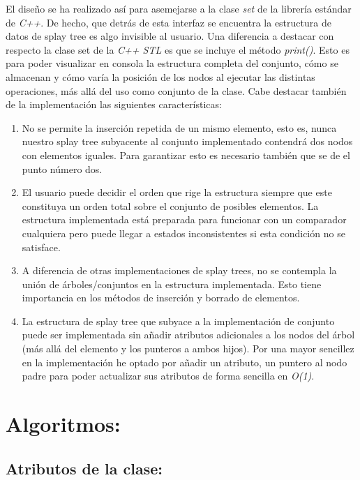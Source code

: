 \documentclass[letterpaper,12pt]{article}
\begin{document}
El diseño se ha realizado así para asemejarse a la clase \textit{set} de la 
librería estándar de \textit{C++}. De hecho, que detrás de esta interfaz se 
encuentra la estructura de datos de splay tree es algo invisible al usuario. 
Una diferencia a destacar con respecto la clase set de la \textit{C++ STL} es 
que se incluye el método \textit{print()}. Esto es para poder visualizar en 
consola la estructura completa del conjunto, cómo se almacenan y cómo varía la
posición de los nodos al ejecutar las distintas operaciones, más allá del uso 
como conjunto de la clase. Cabe destacar también de la implementación las 
siguientes características:

\begin{enumerate}
\setlength{\parskip}{0mm}         %

\item No se permite la inserción repetida de un mismo elemento, esto es, 
      nunca nuestro splay tree subyacente al conjunto implementado contendrá
      dos nodos con elementos iguales. Para garantizar esto es necesario 
      también que se de el punto número dos.
\item El usuario puede decidir el orden que rige la estructura siempre que 
      este constituya un orden total sobre el conjunto de posibles 
      elementos. La estructura implementada está preparada para funcionar con 
      un comparador cualquiera pero puede llegar a estados inconsistentes si 
      esta condición no se satisface.
\item A diferencia de otras implementaciones de splay trees, no se contempla
      la unión de árboles/conjuntos en la estructura implementada. Esto tiene
      importancia en los métodos de inserción y borrado de elementos.
\item La estructura de splay tree que subyace a la implementación de conjunto
      puede ser implementada sin añadir atributos adicionales a los nodos del
      árbol (más allá del elemento y los punteros a ambos hijos). Por una 
      mayor sencillez en la implementación he optado por añadir un atributo,
      un puntero al nodo padre para poder actualizar sus atributos de forma 
      sencilla en \textit{O(1)}.
     
\end{enumerate}

\section{Algoritmos:}
\subsection{Atributos de la clase:}
\end{document}
